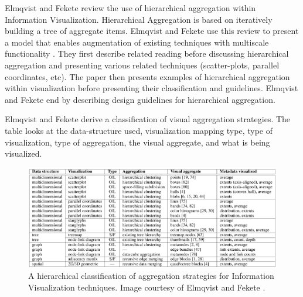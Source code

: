 Elmqvist and Fekete review the use of hierarchical aggregation within Information Visualization. Hierarchical Aggregation is based on iteratively building a tree of aggregate items. Elmqvist and Fekete use this review to present a model that enables augmentation of existing techniques with multiscale functionality \cite{elmqvist2010hierarchical}.
They first describe related reading  before discussing hierarchical aggregation and presenting various related techniques (scatter-plots, parallel coordinates, etc). The paper then presents examples of hierarchical aggregation within visualization before presenting their classification and guidelines. Elmqvist and Fekete end by describing design guidelines for hierarchical aggregation.

Elmqvist and Fekete derive a classification of visual aggregation strategies. The table looks at the data-structure used, visualization mapping type, type of visualization, type of aggregation, the visual  aggregate, and what is being visualized.

\begin{figure}[t]
\begin{center}
\includegraphics[width=1\textwidth]{images/elmqvist2010hierarchical}
\caption{A hierarchical classification of aggregation strategies for Information Visualization techniques. Image courtesy of Elmqvist and Fekete \cite{elmqvist2010hierarchical} .} \label{fig: elmqvist2010hierarchical}
\end{center}
\end{figure}


